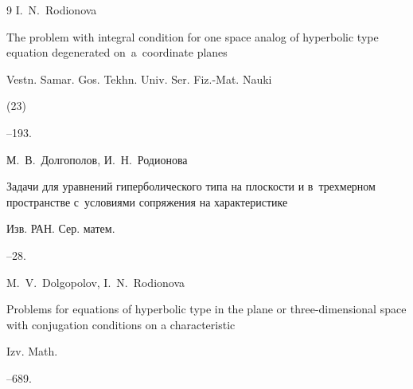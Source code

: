 \begin{thebibliography}{9}
\by I.~N.~Rodionova

\paper The problem with integral condition for one space analog of  hyperbolic type equation degenerated on~a~coordinate planes

\jour Vestn. Samar. Gos. Tekhn. Univ. Ser. Fiz.-Mat. Nauki


(23)

--193.








\by М.~В.~Долгополов, И.~Н.~Родионова

\paper Задачи для уравнений гиперболического типа на плоскости и в~трехмерном пространстве с~условиями сопряжения на характеристике

\jour Изв. РАН. Сер. матем.




--28.






\transl

\by M.~V.~Dolgopolov, I.~N.~Rodionova

\paper Problems for equations of hyperbolic type in the plane or three-dimensional space with conjugation conditions on a characteristic

\jour Izv. Math.




--689.







\end{thebibliography}
